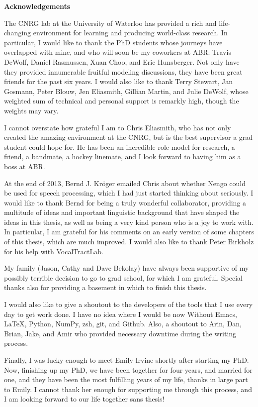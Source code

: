 \begin{center}\textbf{Acknowledgements}\end{center}

The CNRG lab at the University of Waterloo
has provided a rich and life-changing
environment for learning and
producing world-class research.
In particular, I would like to thank
the PhD students whose journeys
have overlapped with mine,
and who will soon be my coworkers at ABR:
Travis DeWolf, Daniel Rasmussen, Xuan Choo,
and Eric Hunsberger.
Not only have they provided
innumerable fruitful modeling discussions,
they have been great friends
for the past six years.
I would also like to thank
Terry Stewart, Jan Gosmann, Peter Blouw,
Jen Eliasmith, Gillian Martin,
and Julie DeWolf,
whose weighted sum of
technical and personal support
is remarkly high,
though the weights may vary.

I cannot overstate how grateful I am
to Chris Eliasmith,
who has not only
created the amazing environment
at the CNRG,
but is the best supervisor
a grad student could hope for.
He has been an incredible
role model for research,
a friend, a bandmate,
a hockey linemate,
and I look forward
to having him as a boss
at ABR.

At the end of 2013,
Bernd J. Kr\"{o}ger emailed Chris
about whether Nengo could be used
for speech processing,
which I had just started
thinking about seriously.
I would like to thank Bernd
for being a truly wonderful collaborator,
providing a multitude of ideas
and important linguistic background
that have shaped the ideas in this thesis,
as well as being a very kind person
who is a joy to work with.
In particular, I am grateful for
his comments on an early version of
some chapters of this thesis,
which are much improved.
I would also like to thank Peter Birkholz
for his help with VocalTractLab.

My family (Jason, Cathy and Dave Bekolay)
have always been supportive
of my possibly terrible decision to go to grad school,
for which I am grateful.
Special thanks also for providing
a basement in which to finish this thesis.

I would also like to give a shoutout
to the developers of the tools
that I use every day to get work done.
I have no idea where I would be now
Without Emacs, \LaTeX, Python,
NumPy, zsh, git, and Github.
Also, a shoutout to Arin, Dan,
Brian, Jake, and Amir
who provided necessary downtime
during the writing process.

Finally, I was lucky enough to
meet Emily Irvine shortly after starting my PhD.
Now, finishing up my PhD,
we have been together for four years,
and married for one,
and they have been the most fulfilling
years of my life,
thanks in large part to Emily.
I cannot thank her enough for
supporting me through this process,
and I am looking forward
to our life together sans thesis!

\cleardoublepage
